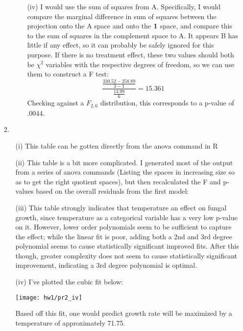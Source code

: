 \documentclass[11pt]{article}
\theoremstyle{definition}
\begin{document}
\begin{itemize}
\begin{itemize}
\begin{itemize}
                        \FloatBarrier
                        
                        \FloatBarrier
                    \item[(iv)] I would use the sum of squares from A. Specifically, I would compare the marginal difference in sum of squares between the projection onto the A space and onto the ${\bf 1}$ space, and compare this to the sum of squares in the complement space to A. It appears B has little if any effect, so it can probably be safely ignored for this purpose. If there is no treatment effect, these two values should both be $\chi^2$ variables with the respective degrees of freedom, so we can use them to construct a F test:
                        \[ \frac{\frac{330.52-258.89}{3-1}}{\frac{13.99}{6}} = 15.361\]
                        Checking against a $F_{2,6}$ distribution, this corresponds to a p-value of $.0044$.
                \end{itemize}
        \end{itemize}
    \item[2.]
        \begin{itemize}
            \item[(i)]
                This table can be gotten directly from the anova command in R
                \FloatBarrier
                
                \FloatBarrier
            \item[(ii)]
                This table is a bit more complicated. I generated most of the output from a series of anova commands (Listing the spaces in increasing size so as to get the right quotient spaces), but then recalculated the F and p-values based on the overall residuals from the first model:
                \FloatBarrier
                
                \FloatBarrier
            \item[(iii)] This table strongly indicates that temperature an effect on fungal growth, since temperature as a categorical variable has a very low p-value on it. However, lower order polynomials seem to be sufficient to capture the effect; while the linear fit is poor, adding both a 2nd and 3rd degree polynomial seems to cause statistically significant improved fits. After this though, greater complexity does not seem to cause statistically significant improvement, indicating a 3rd degree polynomial is optimal.
            \item[(iv)]
                I've plotted the cubic fit below:
                \FloatBarrier
                \begin{center}
                    \texttt{[image: hw1/pr2\_iv]}
                \end{center}
                \FloatBarrier
                Based off this fit, one would predict growth rate will be maximized by a temperature of approximately 71.75.


\end{itemize}
\end{itemize}
\end{document}
